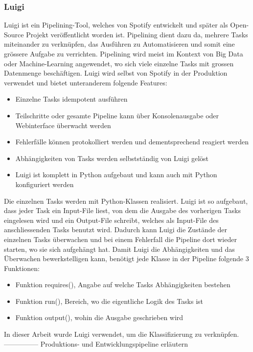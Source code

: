 \subsubsection{Luigi}
Luigi ist ein Pipelining-Tool, welches von Spotify entwickelt und später als Open-Source Projekt veröffentlicht worden ist.
Pipelining dient dazu da, mehrere Tasks miteinander zu verknüpfen, das Ausführen zu Automatisieren und somit eine grössere Aufgabe zu verrichten.
Pipelining wird meist im Kontext von Big Data oder Machine-Learning angewendet, wo sich viele einzelne Tasks mit grossen Datenmenge beschäftigen.
Luigi wird selbst von Spotify in der Produktion verwendet und bietet unteranderem folgende Features:
\begin{itemize}
	\item Einzelne Tasks idempotent ausführen
	\item Teilschritte oder gesamte Pipeline kann über Konsolenausgabe oder Webinterface überwacht werden
	\item Fehlerfälle können protokolliert werden und dementsprechend reagiert werden
	\item Abhängigkeiten von Tasks werden selbstständig von Luigi gelöst
	\item Luigi ist komplett in Python aufgebaut und kann auch mit Python konfiguriert werden
\end{itemize}
Die einzelnen Tasks werden mit Python-Klassen realisiert.
Luigi ist so aufgebaut, dass jeder Task ein Input-File liest, von dem die Ausgabe des vorherigen Tasks eingelesen wird und ein Output-File schreibt, welches als Input-File des anschliessenden Tasks benutzt wird.
Dadurch kann Luigi die Zustände der einzelnen Tasks überwachen und bei einem Fehlerfall die Pipeline dort wieder starten, wo sie sich aufgehängt hat.
Damit Luigi die Abhängigkeiten und das Überwachen bewerkstelligen kann, benötigt jede Klasse in der Pipeline folgende 3 Funktionen:
\begin{itemize}
	\item Funktion requires(), Angabe auf welche Tasks Abhängigkeiten bestehen
	\item Funktion run(), Bereich, wo die eigentliche Logik des Tasks ist
	\item Funktion output(), wohin die Ausgabe geschrieben wird
\end{itemize}
In dieser Arbeit wurde Luigi verwendet, um die Klassifizierung zu verknüpfen.
--------------- Produktions- und Entwicklungspipeline erläutern
